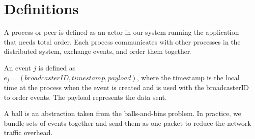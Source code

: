 \section{Definitions}
\label{sec:definitions}
A process or peer is defined as an actor in our system running the application that needs total order. Each process communicates with other processes in the distributed system, exchange events, and order them together.  
\par
An event $j$ is defined as \\$e_j=(broadcasterID,timestamp,payload)$, where the timestamp is the local time at the process when the event is created and is used with the broadcasterID to order events. The payload represents the data sent. %
\par
A ball is an abstraction taken from the balls-and-bins problem. In practice, we bundle sets of events together and send them as one packet to reduce the network traffic overhead.  

